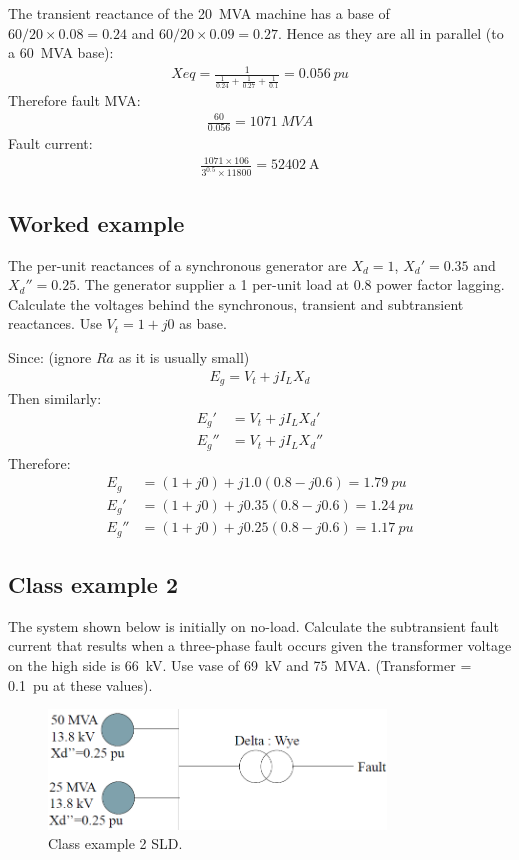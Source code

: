 The transient reactance of the \SI{20}{MVA} machine has a base of $60/20 \times 0.08 = 0.24$ and $60/20 \times 0.09 = 0.27$. Hence as they are all in parallel (to a \SI{60}{MVA} base):
\begin{gather}
    Xeq = \frac{1}{\frac{1}{0.24}+ \frac{1}{0.27} + \frac{1}{0.1}} = \SI{0.056}{pu}
\end{gather}
Therefore fault MVA:
\begin{gather}
    \frac{60}{0.056} = \SI{1071}{MVA}
\end{gather}
Fault current:
\begin{gather}
    \frac{1071\times 106}{3^{0.5}\times 11800} = \SI{52402}{\ampere}
\end{gather}
\subsection{Worked example}
The per-unit reactances of a synchronous generator are $X_d =1$, $X_d' = 0.35$ and $X_d'' = 0.25$. The generator supplier a 1 per-unit load at 0.8 power factor lagging. Calculate the voltages behind the synchronous, transient and subtransient reactances. Use $V_t = 1+j0$ as base.

Since: (ignore $Ra$ as it is usually small)
\begin{gather}
    E_g = V_t + jI_LX_d
\end{gather}
Then similarly:
\begin{align}
    E_g'  & = V_t + jI_LX_d'  \\
    E_g'' & = V_t + jI_LX_d''
\end{align}
Therefore:
\begin{align}
    E_g   & = \left(1+j0\right) + j1.0  \left(0.8-j0.6\right) = \SI{1.79}{pu} \\
    E_g'  & = \left(1+j0\right) + j0.35 \left(0.8-j0.6\right) = \SI{1.24}{pu} \\
    E_g'' & = \left(1+j0\right) + j0.25 \left(0.8-j0.6\right) = \SI{1.17}{pu}
\end{align}
\subsection{Class example 2}
The system shown below is initially on no-load. Calculate the subtransient fault current that results when a three-phase fault occurs given the transformer voltage on the high side is \SI{66}{\kilo\volt}. Use vase of \SI{69}{\kilo\volt} and \SI{75}{MVA}. (Transformer = \SI{0.1}{pu} at these values).
\begin{figure}[H]
    \centering
    \includegraphics[width = 0.8\textwidth]{img/figure91.png}
    \caption{Class example 2 SLD.}
\end{figure}

